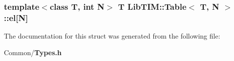 \subsubsection{\setlength{\rightskip}{0pt plus 5cm}template$<$class T, int N$>$ T {\bf Lib\-TIM::Table}$<$ T, N $>$::{\bf el}[N]}\label{structLibTIM_1_1Table_o0}




The documentation for this struct was generated from the following file:\begin{CompactItemize}
\item 
Common/{\bf Types.h}\end{CompactItemize}
